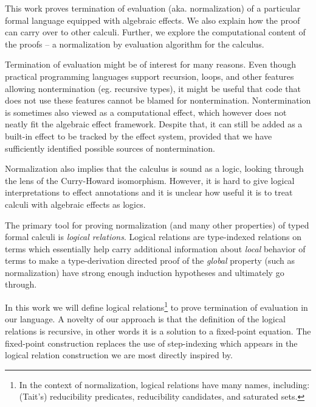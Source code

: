 \documentclass[a4paper, 12pt]{report}
\newcommand{\+}{\enspace}
\begin{document}
This work proves termination of evaluation (aka. normalization) of a
particular formal language equipped with algebraic effects.
We also explain how the proof can carry over to other calculi.
Further, we explore the computational content of the proofs –
a normalization by evaluation algorithm for the calculus.

Termination of evaluation might be of interest for many reasons.
Even though practical programming languages support recursion, loops, and other
features allowing nontermination (eg. recursive types),
it might be useful that code that does not use these features cannot be blamed
for nontermination.
Nontermination is sometimes also viewed as a computational effect,
which however does not neatly fit the algebraic effect framework.
Despite that, it can still be added as a built-in effect to be tracked by
the effect system, provided that we have sufficiently identified possible sources %
of nontermination.

Normalization also implies that the calculus is sound as a logic, %
looking through the lens of the Curry-Howard isomorphism.
However, it is hard to give logical interpretations to effect annotations \cite{oleg}
and it is unclear how useful it is to treat calculi with algebraic effects as logics.


The primary tool for proving normalization (and many other properties) of %
typed formal calculi is {\em logical relations}.  Logical relations are %
type-indexed relations on terms which essentially help carry additional
information about {\em local} behavior of terms to make a type-derivation
directed proof of the {\em global} property (such as normalization)
have strong enough induction hypotheses and ultimately go through.

In this work we will define logical relations\footnote{
	In the context of normalization, logical relations have many names, including:
	(Tait's) reducibility predicates, reducibility candidates, and saturated sets.
}
to prove termination
of evaluation in our language.
A novelty of our approach
is that the definition of the logical relations
is recursive, in other words it is a solution to a fixed-point equation.
The fixed-point construction replaces the use of step-indexing %
which appears in the logical relation construction we are most directly inspired by.
\end{document}
